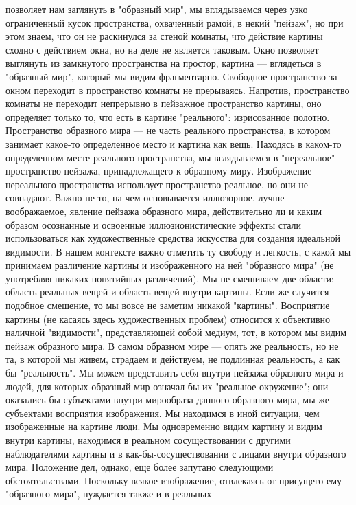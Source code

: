 \documentclass[12pt]{article}
\begin{document}
позволяет нам заглянуть в "образный мир", мы вглядываемся через узко ограниченный кусок пространства,
охваченный рамой, в некий "пейзаж", но при этом знаем, что он не раскинулся за стеной комнаты, что действие
картины сходно с действием окна, но на деле не является таковым. Окно позволяет выглянуть из замкнутого
пространства на простор, картина --- вглядеться в "образный мир", который мы видим фрагментарно. Свободное
пространство за окном переходит в пространство комнаты не прерываясь. Напротив, пространство комнаты не
переходит  непрерывно  в  пейзажное  пространство  картины,  оно  определяет  только  то,  что  есть  в  картине
"реального":  изрисованное  полотно.  Пространство  образного  мира  ---  не  часть  реального  пространства,  в
котором занимает какое-то определенное место и картина как вещь. Находясь в каком-то определенном месте
реального пространства, мы вглядываемся в "нереальное" пространство пейзажа, принадлежащего к образному
миру. Изображение нереального пространства использует пространство реальное, но они не совпадают. Важно
не  то,  на  чем  основывается  иллюзорное,  лучше  ---  воображаемое,  явление  пейзажа  образного  мира,
действительно  ли  и  каким  образом  осознанные  и  освоенные  иллюзионистические  эффекты  стали
использоваться как художественные средства искусства для создания идеальной видимости. В нашем контексте
важно отметить ту свободу и легкость, с какой мы принимаем различение картины и изображенного на ней
"образного мира" (не употребляя никаких понятийных различений). Мы не смешиваем две области: область
реальных вещей и область вещей внутри картины. Если же случится подобное смешение, то мы вовсе не
заметим никакой "картины". Восприятие картины (не касаясь здесь художественных проблем) относится к
объективно наличной "видимости", представляющей собой медиум, тот, в котором мы видим пейзаж образного
мира. В самом образном мире --- опять же реальность, но не та, в которой мы живем, страдаем и действуем, не
подлинная реальность, а как бы "реальность". Мы можем представить себя внутри пейзажа образного мира и
людей, для которых образный мир означал бы их "реальное окружение"; они оказались бы субъектами внутри
мирообраза данного образного мира, мы же --- субъектами восприятия изображения. Мы находимся в иной
ситуации, чем изображенные на картине люди. Мы одновременно видим картину и видим внутри картины,
находимся в реальном сосуществовании с другими наблюдателями картины и в как-бы-сосуществовании с
лицами внутри образного мира. Положение дел, однако, еще более запутано следующими обстоятельствами.
Поскольку всякое изображение, отвлекаясь от присущего ему "образного мира", нуждается также и в реальных
\end{document}
